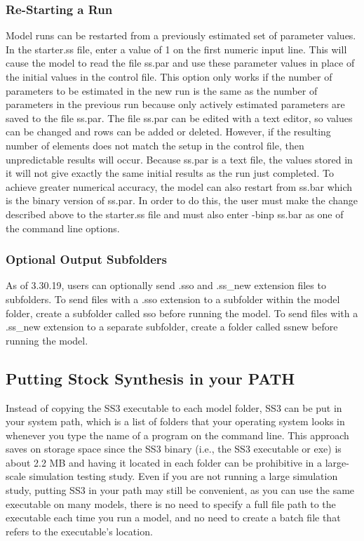 \subsubsection{Re-Starting a Run}
Model runs can be restarted from a previously estimated set of parameter values. In the starter.ss file, enter a value of 1 on the first numeric input line. This will cause the model to read the file ss.par and use these parameter values in place of the initial values in the control file. This option only works if the number of parameters to be estimated in the new run is the same as the number of parameters in the previous run because only actively estimated parameters are saved to the file ss.par. The file ss.par can be edited with a text editor, so values can be changed and rows can be added or deleted.  However, if the resulting number of elements does not match the setup in the control file, then unpredictable results will occur. Because ss.par is a text file, the values stored in it will not give exactly the same initial results as the run just completed. To achieve greater numerical accuracy, the model can also restart from ss.bar which is the binary version of ss.par. In order to do this, the user must make the change described above to the starter.ss file and must also enter -binp ss.bar as one of the command line options.

\subsubsection{Optional Output Subfolders}
As of 3.30.19, users can optionally send .sso and .ss\_new extension files to subfolders. To send files with a .sso extension to a subfolder within the model folder, create a subfolder called sso before running the model. To send files with a .ss\_new extension to a separate subfolder, create a folder called ssnew before running the model.

\subsection{Putting Stock Synthesis in your PATH}

Instead of copying the SS3 executable to each model folder, SS3 can be put in your system path, which is a list of folders that your operating system looks in whenever you type the name of a program on the command line. This approach saves on storage space since the SS3 binary (i.e., the SS3 executable or exe) is about 2.2 MB and having it located in each folder can be prohibitive in a large-scale simulation testing study. Even if you are not running a large simulation study, putting SS3 in your path may still be convenient, as you can use the same executable on many models, there is no need to specify a full file path to the executable each time you run a model, and no need to create a batch file that refers to the executable's location.

